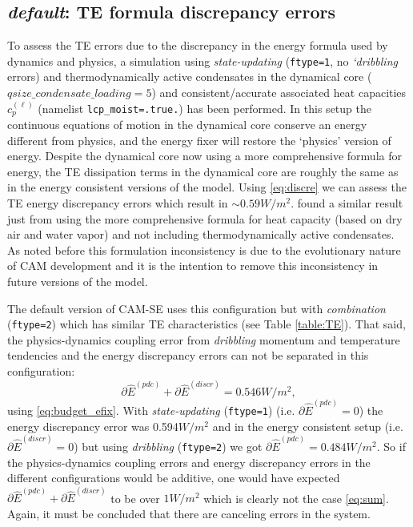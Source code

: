 \documentclass{agujournal}
\newcommand*{\gi}[1]{\widehat{#1}}
\begin{document}
\subsection{{\em{default}}: TE formula discrepancy errors}\label{sec:ediscr}
To assess the TE errors due to the discrepancy in the energy formula used by dynamics and physics, a simulation using {\em{state-updating}} ({\tt{ftype=1}}, no {\em{`dribbling}} errors) and thermodynamically active condensates in the dynamical core ($qsize\_condensate\_loading=5$) and consistent/accurate associated heat capacities $c_p^{(\ell)}$ (namelist {\tt{lcp\_moist=.true.}}) has been performed. In this setup the continuous equations of motion in the dynamical core conserve an energy different from physics, and the energy fixer will restore the `physics' version of energy. Despite the dynamical core now using a more comprehensive formula for energy, the TE dissipation terms in the dynamical core are roughly the same as in the energy consistent versions of the model. Using \eqref{eq:discre} we can assess the TE energy discrepancy errors which result in $\sim 0.59W/m^2$. \citet{T2011LNCSEb} found a similar result just from using the more comprehensive formula for heat capacity (based on dry air and water vapor) and not including thermodynamically active condensates. As noted before this formulation inconsistency is due to the evolutionary nature of CAM development and it is the intention to remove this inconsistency in future versions of the model.

The default version of CAM-SE uses this configuration but with {\em{combination}} ({\tt{ftype=2}}) which has similar TE characteristics (see Table \ref{table:TE}). That said, the physics-dynamics coupling error from {\em{dribbling}} momentum and temperature tendencies and the energy discrepancy errors can not be separated in this configuration:
\begin{equation}
\label{eq:sum}
\partial \gi{E}^{({pdc})}+\partial \gi{E}^{({discr})}=0.546W/m^2,
\end{equation}
using \eqref{eq:budget_efix}. With {\em{state-updating}} ({\tt{ftype=1}}) (i.e. $\partial \gi{E}^{({pdc})}=0$) the energy discrepancy error was 0.594$W/m^2$ and in the energy consistent setup (i.e. $\partial \gi{E}^{({discr})}=0$) but using {\em{dribbling}} ({\tt{ftype=2}}) we got $\partial \gi{E}^{({pdc})}=0.484W/m^2$. So if the physics-dynamics coupling errors and energy discrepancy errors in the different configurations would be additive, one would have expected $\partial \gi{E}^{({pdc})}+\partial \gi{E}^{({discr})}$ to be over $1W/m^2$ which is clearly not the case \eqref{eq:sum}. Again, it must be concluded that there are canceling errors in the system.
\end{document}
